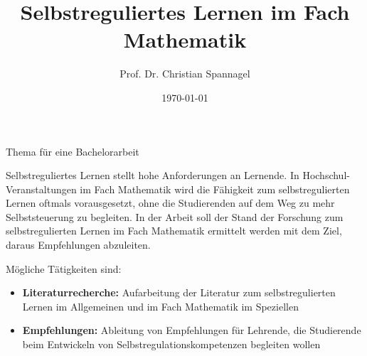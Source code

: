\documentclass{../cssheet}
\title{Selbstreguliertes Lernen im Fach Mathematik}
\author{Prof. Dr. Christian Spannagel}
\date{\today}
\begin{document}
\vspace*{5mm}
\begin{center}
{\Large Thema für eine Bachelorarbeit}
\end{center}

\printtitle
\vspace*{1cm}

Selbstreguliertes Lernen stellt hohe Anforderungen an Lernende. In Hochschul-Veranstaltungen im Fach Mathematik wird die Fähigkeit zum selbstregulierten Lernen oftmals vorausgesetzt, ohne die Studierenden auf dem Weg zu mehr Selbststeuerung zu begleiten. In der Arbeit soll der Stand der Forschung zum selbstregulierten Lernen im Fach Mathematik ermittelt werden mit dem Ziel, daraus Empfehlungen abzuleiten.

Mögliche Tätigkeiten sind:
\begin{itemize}
\item \textbf{Literaturrecherche:} Aufarbeitung der Literatur zum selbstregulierten Lernen im Allgemeinen und im Fach Mathematik im Speziellen
\item \textbf{Empfehlungen:} Ableitung von Empfehlungen für Lehrende, die Studierende beim Entwickeln von Selbstregulationskompetenzen begleiten wollen
\end{itemize}

\vspace*{10mm}

\printlicense

\printsocials
\end{document}
